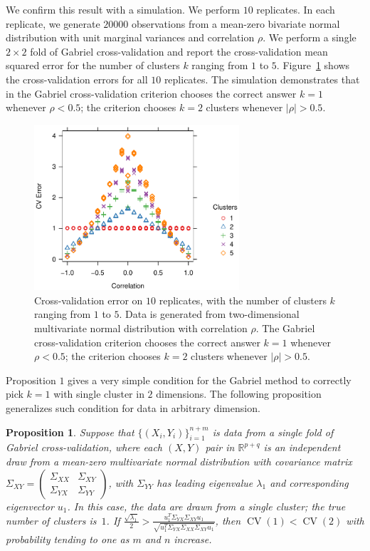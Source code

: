 \documentclass[12pt]{article}
\newtheorem{proposition}{Proposition}
\newcommand{\CV}{\operatorname{CV}}
\newcommand{\R}{\mathbb{R}}
\begin{document}
We confirm this result with a simulation.  We perform $10$ replicates.  In each
replicate, we generate $20000$ observations from a mean-zero bivariate normal
distribution with unit marginal variances and correlation $\rho$.  We perform
a single $2 \times 2$ fold of Gabriel cross-validation and report the
cross-validation mean squared error for the number of clusters $k$ ranging
from $1$ to $5$.  Figure~\ref{fig:nullcorr-equal} shows the cross-validation
errors for all $10$ replicates.  The simulation demonstrates that in the
Gabriel cross-validation criterion chooses the correct answer $k = 1$ whenever
$\rho < 0.5$; the criterion chooses $k = 2$ clusters whenever $|\rho| > 0.5$.

\begin{figure}[H]
\centering
\includegraphics[width=3in]{demo/nullcorr/equal.pdf}
\caption{Cross-validation error on $10$ replicates, with the number of
clusters $k$ ranging from $1$ to $5$.  Data is generated from two-dimensional
multivariate normal distribution with correlation $\rho$.  The Gabriel
cross-validation criterion chooses the correct answer $k = 1$ whenever
$\rho < 0.5$; the criterion chooses $k = 2$ clusters whenever $|\rho| > 0.5$.}
\label{fig:nullcorr-equal}
\end{figure}

Proposition $1$ gives a very simple condition for the Gabriel method to correctly 
pick $k=1$ with single cluster in $2$ dimensions. The following proposition generalizes
such condition for data in arbitrary dimension. 

\begin{proposition}
Suppose that $\{ (X_i, Y_i) \}_{i=1}^{n + m}$ is data from a single fold
of Gabriel cross-validation, where each $(X,Y)$ pair in $\R^{p+q}$ is an
independent draw from a mean-zero multivariate normal distribution with 
covariance matrix $\Sigma_{XY}= \left( \begin{smallmatrix} \Sigma_{XX} & \Sigma_{XY} \\ 
 \Sigma_{YX} & \Sigma_{YY} \end{smallmatrix}\right)$, with $\Sigma_{YY}$ has leading 
eigenvalue $\lambda_1$ and corresponding eigenvector $u_1$. In this case, the data are drawn
from a single cluster; the true number of clusters is~$1$.  If  $\frac{\sqrt{\lambda_1}}{2}
 > \frac{u^T_1\Sigma_{YX}\Sigma_{XY}u_1}{\sqrt{u^T_1\Sigma_{YX} \Sigma_{XX} \Sigma_{XY} u_1}}$,
then $\CV(1) < \CV(2)$ with probability tending to one as $m$ and $n$ increase.
\end{proposition}
\end{document}
